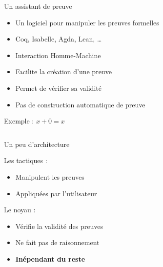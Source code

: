 \documentclass[french,usepdftitle=false,compress]{beamer}
\begin{document}
\begin{frame}{Un assistant de preuve}
  \begin{block}{}
    \begin{itemize}
      \item Un logiciel pour manipuler les preuves formelles
      \item Coq, Isabelle, Agda, Lean, \dots
      \item Interaction Homme-Machine
    \end{itemize}
  \end{block}

  \begin{exampleblock}{}
    \begin{itemize}
      \item Facilite la création d'une preuve
      \item Permet de vérifier sa validité
    \end{itemize}
  \end{exampleblock}

  \begin{alertblock}{}
    \begin{itemize}
      \item Pas de construction automatique de preuve
    \end{itemize}
  \end{alertblock}
\end{frame}

\begin{frame}{Exemple : $x + 0 = x$}
  \inputminted{coq}{basic.v}
\end{frame}

\begin{frame}{Un peu d'architecture}
  \begin{block}{Les tactiques :}
    \begin{itemize}
      \item Manipulent les preuves
      \item Appliquées par l'utilisateur
    \end{itemize}
  \end{block}

  \begin{block}{Le noyau :}
    \begin{itemize}
      \item Vérifie la validité des preuves
      \item Ne fait pas de raisonnement
      \item \textbf{Inépendant du reste}
    \end{itemize}
  \end{block}
\end{frame}
\end{document}
